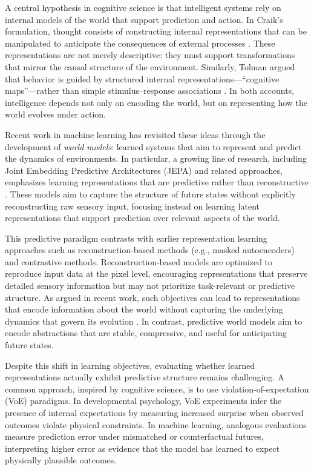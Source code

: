\documentclass[10pt,twocolumn]{article}
\begin{document}
A central hypothesis in cognitive science is that intelligent systems rely on internal models of the world that support prediction and action. In Craik's formulation, thought consists of constructing internal representations that can be manipulated to anticipate the consequences of external processes \citep{craik1944nature}. These representations are not merely descriptive: they must support transformations that mirror the causal structure of the environment. Similarly, Tolman argued that behavior is guided by structured internal representations---``cognitive maps''---rather than simple stimulus--response associations \citep{tolman1948cognitive}. In both accounts, intelligence depends not only on encoding the world, but on representing how the world evolves under action.

Recent work in machine learning has revisited these ideas through the development of \emph{world models}: learned systems that aim to represent and predict the dynamics of environments. In particular, a growing line of research, including Joint Embedding Predictive Architectures (JEPA) and related approaches, emphasizes learning representations that are predictive rather than reconstructive \citep{lecun2023jepa, lecun2024worldmodels}. These models aim to capture the structure of future states without explicitly reconstructing raw sensory input, focusing instead on learning latent representations that support prediction over relevant aspects of the world.

This predictive paradigm contrasts with earlier representation learning approaches such as reconstruction-based methods (e.g., masked autoencoders) and contrastive methods. Reconstruction-based models are optimized to reproduce input data at the pixel level, encouraging representations that preserve detailed sensory information but may not prioritize task-relevant or predictive structure. As argued in recent work, such objectives can lead to representations that encode information about the world without capturing the underlying dynamics that govern its evolution \citep{lecun2023jepa}. In contrast, predictive world models aim to encode abstractions that are stable, compressive, and useful for anticipating future states.

Despite this shift in learning objectives, evaluating whether learned representations actually exhibit predictive structure remains challenging. A common approach, inspired by cognitive science, is to use violation-of-expectation (VoE) paradigms. In developmental psychology, VoE experiments infer the presence of internal expectations by measuring increased surprise when observed outcomes violate physical constraints. In machine learning, analogous evaluations measure prediction error under mismatched or counterfactual futures, interpreting higher error as evidence that the model has learned to expect physically plausible outcomes.
\end{document}

